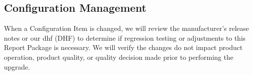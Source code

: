 \subsection{Configuration Management}
When a Configuration Item is changed, we will review the manufacturer's release
notes or our \Gls{dhf} (DHF) to determine if regression testing or
adjustments to this Report Package is necessary. We will verify the changes do
not impact product operation, product quality, or quality decision made prior
to performing the upgrade.

